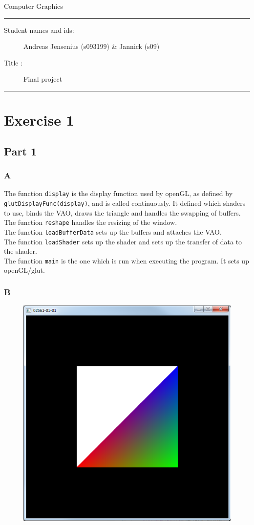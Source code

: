 \documentclass[11pt]{article}
\begin{document}
\begin{center}
{{\Large \sc Computer Graphics}}
\end{center}
\rule{\textwidth}{1pt}
\begin{description}
\item[Student names and ids:] Andreas Jensenius (s093199) \& Jannick (s09) 
\item[Title :] Final project
\end{description}
\rule{\textwidth}{1pt}

\section{Exercise 1}
\subsection{Part 1}
\subsubsection{A}
The function \texttt{display} is the display function used by openGL, as defined by \texttt{glutDisplayFunc(display)}, and is called continuously. It defined which shaders to use, binds the VAO, draws the triangle and handles the swapping of buffers.\\

\noindent The function \texttt{reshape} handles the resizing of the window.\\

\noindent The function \texttt{loadBufferData} sets up the buffers and attaches the VAO.\\

\noindent The function \texttt{loadShader} sets up the shader and sets up the transfer of data to the shader.\\

\noindent The function \texttt{main} is the one which is run when executing the program. It sets up openGL/glut.

\subsubsection{B}
\begin{figure}[H]
\centering
\includegraphics[width=0.5\linewidth]{images/e01p1b}
\label{fig:e01p1b}
\end{figure}
\end{document}
